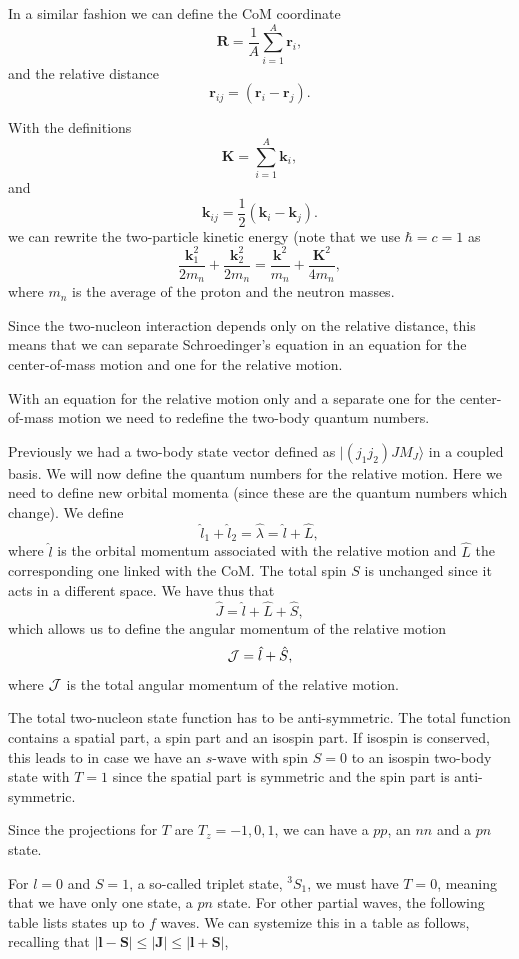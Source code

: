 \documentclass[%
oneside,                 %
final,                   %
10pt]{article}
\begin{document}
In a similar fashion we can define the CoM coordinate
 \[
     \mathbf{R}=\frac{1}{A}\sum_{i=1}^{A}\mathbf{r}_i,
 \]
 and the relative distance 
\[
    \mathbf{r}_{ij}=(\mathbf{r}_i-\mathbf{r}_j).
 \]

With the definitions
 \[
    \mathbf{K}=\sum_{i=1}^A\mathbf{k}_i,
 \]
and
\[
    \mathbf{k}_{ij}=\frac{1}{2}(\mathbf{k}_i-\mathbf{k}_j).
 \]
we can rewrite the two-particle kinetic energy (note that we use $\hbar=c=1$ as 
\[
\frac{\mathbf{k}_1^2}{2m_n}+\frac{\mathbf{k}_2^2}{2m_n}=\frac{\mathbf{k}^2}{m_n}+\frac{\mathbf{K}^2}{4m_n},
\]
where $m_n$ is the average of the proton and the neutron masses. 

Since the two-nucleon interaction depends only on the relative distance, this means that we can separate Schroedinger's equation in an equation for the center-of-mass motion and one for the relative motion.

With an equation for the relative motion only and a separate one for the center-of-mass motion we need to redefine the two-body quantum numbers.

Previously we had a two-body state vector defined as $|(j_1j_2)JM_J\rangle$ in a coupled basis. 
We will now define the quantum numbers for the relative motion. Here we need to define new orbital momenta (since these are the quantum numbers which change). 
We define 
\[
\hat{l}_1+\hat{l}_2=\hat{\lambda}=\hat{l}+\hat{L},
\]
where $\hat{l}$ is the orbital momentum associated with the relative motion and
$\hat{L}$ the corresponding one linked with the CoM. The total spin $S$ is unchanged since it acts in a different space. We have thus that
\[
\hat{J}=\hat{l}+\hat{L}+\hat{S},
\]
which allows us to define the angular momentum of the relative motion
\[
{ \cal J} =  \hat{l}+\hat{S},
\]
where ${ \cal J}$ is the total angular momentum of the relative motion.

The total two-nucleon state function has to be anti-symmetric. The total function contains a spatial part, a spin part and an isospin part. If isospin is conserved, this leads to in case we have an $s$-wave with spin $S=0$ to an isospin 
two-body state with $T=1$ since the spatial part is symmetric and the spin part is anti-symmetric. 

Since the projections for $T$ are $T_z=-1,0,1$, we can have a $pp$, an $nn$ and a $pn$ state.

For $l=0$ and $S=1$, a so-called triplet state, $^3S_1$, we must have $T=0$, meaning that we have only one state, a $pn$ state. For other partial waves, the following table lists states up to $f$ waves.
We can systemize this in a table as follows, recalling that $|\mathbf{l}-\mathbf{S}| \le |\mathbf{J}| \le |\mathbf{l}+\mathbf{S}|$,  
\end{document}
